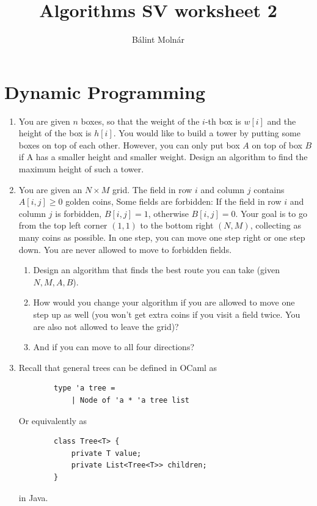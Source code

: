 \documentclass{article}
\title{{Algorithms SV worksheet 2}}
\author{Bálint Molnár}
\begin{document}
\maketitle


\section{Dynamic Programming}

\begin{enumerate}
    \item You are given $n$ boxes, so that the weight of the $i$-th box is $w[i]$ and the height of the box is $h[i]$. You would like to build a tower by putting some boxes on top of each other. However, you can only put box $A$ on top of box $B$ if A has a smaller height and smaller weight. Design an algorithm to find the maximum height of such a tower.
    \item

    You are given an $N \times M$ grid. The field in row $i$ and column $j$ contains $A[i,j]\geq0$ golden coins, Some fields are forbidden: If the field in row $i$ and column $j$ is forbidden, $B[i,j] = 1$, otherwise $B[i,j]=0$. Your goal is to go from the top left corner $(1,1)$ to the bottom right $(N,M)$, collecting as many coins as possible. In one step, you can move one step right or one step down. You are never allowed to move to forbidden fields.
    \begin{enumerate}
        \item Design an algorithm that finds the best route you can take (given $N,M,A,B$).
        \item How would you change your algorithm if you are allowed to move one step up as well (you won't get extra coins if you visit a field twice. You are also not allowed to leave the grid)?
        \item And if you can move to all four directions?
    \end{enumerate}
    
    
    \item Recall that general trees can be defined in OCaml as
    \begin{verbatim}
        type 'a tree =
            | Node of 'a * 'a tree list
    \end{verbatim}

    Or equivalently as

    \begin{verbatim}
        class Tree<T> {
            private T value;
            private List<Tree<T>> children;
        }
    \end{verbatim}
    in Java.


\end{enumerate}
\end{document}
